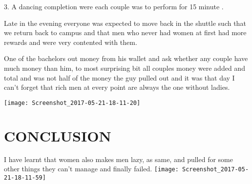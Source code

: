 \documentclass{article}
\begin{document}
3.	A dancing completion were each couple was to perform for 15 minute .
\newline

Late in the evening everyone was expected to move back in the shuttle such that we return back to campus and that men who never had women at first had more rewards and were very contented with them.
\newline

One of the bachelors out money from his wallet and ask whether any couple have much money than him, to most surprising bit all couples money were added and total and was not half of the money the guy pulled out and it was that day I can’t forget that rich men at every point are always the one without ladies.

\texttt{[image: Screenshot\_2017-05-21-18-11-20]}





\section{CONCLUSION}
I have learnt that women also makes men lazy, as same, and pulled for some other things they can’t manage and finally failed.
\texttt{[image: Screenshot\_2017-05-21-18-11-59]}
\end{document}

